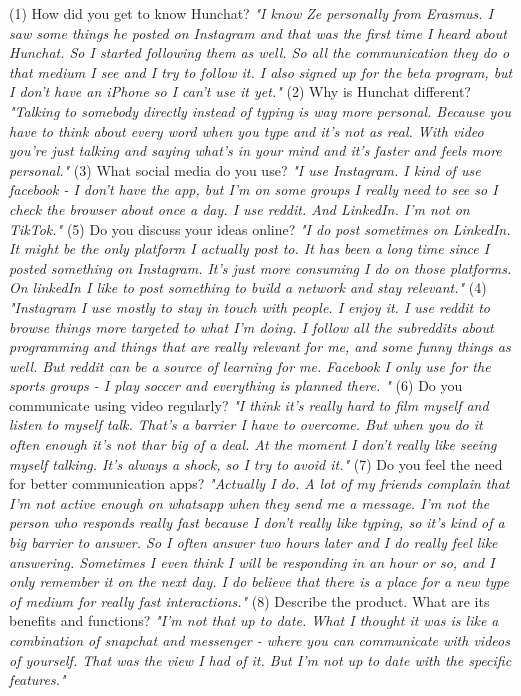 \documentclass[12pt]{article}
\begin{document}
(1) How did you get to know Hunchat? \textit{"I know Ze personally from Erasmus. I saw some things he posted on Instagram and that was the first time I heard about Hunchat. So I started following them as well. So all the communication they do o that medium I see and I try to follow it. I also signed up for the beta program, but I don't have an iPhone so I can't use it yet."}
(2) Why is Hunchat different? \textit{"Talking to somebody directly instead of typing is way more personal. Because you have to think about every word when you type and it's not as real. With video you're just talking and saying what's in your mind and it's faster and feels more personal."}
(3) What social media do you use? \textit{"I use Instagram. I kind of use facebook - I don't have the app, but I'm on some groups I really need to see so I check the browser about once a day. I use reddit. And LinkedIn. I'm not on TikTok."}
(5) Do you discuss your ideas online? \textit{"I do post sometimes on LinkedIn. It might be the only platform I actually post to. It has been a long time since I posted something on Instagram. It's just more consuming I do on those platforms. On linkedIn I like to post something to build a network and stay relevant."}
(4)  \textit{"Instagram I use mostly to stay in touch with people. I enjoy it. I use reddit to browse things more targeted to what I'm doing. I follow all the subreddits about programming and things that are really relevant for me, and some funny things as well. But reddit can be a source of learning for me. Facebook I only use for the sports groups - I play soccer and everything is planned there. "}
(6) Do you communicate using video regularly? \textit{"I think it's really hard to film myself and listen to myself talk. That's a barrier I have to overcome. But when you do it often enough it's not thar big of a deal. At the moment I don't really like seeing myself talking. It's always a shock, so I try to avoid it."}
(7) Do you feel the need for better communication apps? \textit{"Actually I do. A lot of my friends complain that I'm not active enough on whatsapp when they send me a message. I'm not the person who responds really fast because I don't really like typing, so it's kind of a big barrier to answer. So I often answer two hours later and I do really feel like answering. Sometimes I even think I will be responding in an hour or so, and I only remember it on the next day. I do believe that there is a place for a new type of medium for really fast interactions."}
(8) Describe the product. What are its benefits and functions? \textit{"I'm not that up to date. What I thought it was is like a combination of snapchat and messenger - where you can communicate with videos of yourself. That was the view I had of it. But I'm not up to date with the specific features."}
\end{document}
